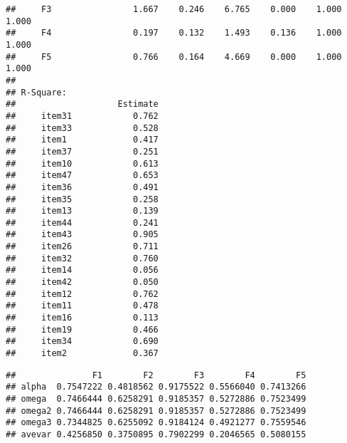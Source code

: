 \documentclass[
  english,
  man]{apa6}
\begin{document}
\begin{verbatim}
##     F3                1.667    0.246    6.765    0.000    1.000    1.000
##     F4                0.197    0.132    1.493    0.136    1.000    1.000
##     F5                0.766    0.164    4.669    0.000    1.000    1.000
## 
## R-Square:
##                    Estimate
##     item31            0.762
##     item33            0.528
##     item1             0.417
##     item37            0.251
##     item10            0.613
##     item47            0.653
##     item36            0.491
##     item35            0.258
##     item13            0.139
##     item44            0.241
##     item43            0.905
##     item26            0.711
##     item32            0.760
##     item14            0.056
##     item42            0.050
##     item12            0.762
##     item11            0.478
##     item16            0.113
##     item19            0.466
##     item34            0.690
##     item2             0.367
\end{verbatim}

\begin{verbatim}
##               F1        F2        F3        F4        F5
## alpha  0.7547222 0.4818562 0.9175522 0.5566040 0.7413266
## omega  0.7466444 0.6258291 0.9185357 0.5272886 0.7523499
## omega2 0.7466444 0.6258291 0.9185357 0.5272886 0.7523499
## omega3 0.7344825 0.6255092 0.9184124 0.4921277 0.7559546
## avevar 0.4256850 0.3750895 0.7902299 0.2046565 0.5080155
\end{verbatim}
\end{document}
